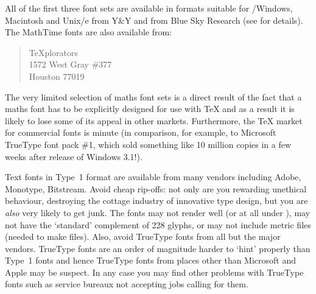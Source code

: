 All of the first three font sets are available in formats suitable for
 /Windows, Macintosh and Unix/e from Y\&Y and from Blue Sky
Research (see  for
details).  The MathTime fonts are also available from:
\begin{quote}
  \TeX{}plorators\\
  1572 West Gray \#377\\
  Houston  77019\\
\end{quote}
The very limited selection of maths font sets is a direct result of
the fact that a maths font has to be explicitly designed for use with
\TeX{} and as a result it is likely to lose some of its appeal in
other markets. Furthermore, the \TeX{} market for commercial fonts is
minute (in comparison, for example, to Microsoft TrueType font pack
\#1, which sold something like 10 million copies in a few weeks after
release of Windows 3.1!).

Text fonts in Type~1 format are available from many vendors including
Adobe, Monotype, Bitstream.  Avoid cheap rip-offs: not only are you
rewarding unethical behaviour, destroying the cottage industry of
innovative type design, but you are \emph{also} very likely to get junk.
The fonts may not render well (or at all under ), may not have the
`standard' complement of 228 glyphs, or may not include metric files
(needed to make  files). Also, avoid TrueType fonts from all but
the major vendors.  TrueType fonts are an order of magnitude harder to
`hint' properly than Type~1 fonts and hence TrueType fonts from places
other than Microsoft and Apple may be suspect.  In any case you may
find other problems with TrueType fonts such as service bureaux not
accepting jobs calling for them.

\begin{comment}
Incidentally, some people have been disappointed in the quality of scalable
fonts. Of course, quality is in the eye of the beholder and people disagree
sometimes on what is `better' --- but in many cases there is no question!
There are several factors that come into play.  One is the quality of
the font itself (you get what you pay for), and the other is the quality of
the rasteriser.  

Rendering under \acro{ATM} of commercial grade fonts is outstanding.
Rendering in
Display PostScript is not quite as good (which may change if \acro{DPS} systems
adopt the \acro{ATM} rasteriser).  PostScript rasterisers in printers
are not as
good as \acro{ATM} either (except for a few printers that use the \acro{ATM}
rasteriser)~--- but then at 300~dpi you are dealing with a much more forgiving
environment than at 96~dpi (Windows) or 72~dpi (Mac).  Clone \acro{PS}
interpreters
tend to not be as good as true Adobe \acro{RIP}s.  In some cases the
difference is
not huge (\acro{HP}), in other cases it is (public domain).  Utilities for
converting from \acro{PS} to \acro{PK} format typically do not produce
results comparable
to \acro{ATM} (of course, at high enough resolution --- where
grid-fitting is less
important --- it hardly matters).  
\end{comment}

